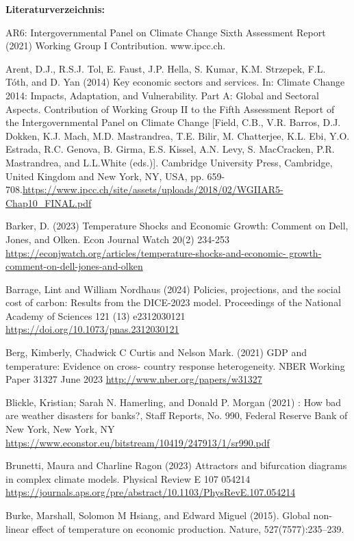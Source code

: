 \documentclass[12pt,paper=a4,DIV=12,parskip=never,chapterprefix=false,headings=standardclasses]{scrreprt}
\begin{document}
\vfill
\noindent\textbf{Literaturverzeichnis:}

\begingroup
\parindent=0pt
\everypar{\hangindent=2em\hangafter=1\relax}

AR6: Intergovernmental Panel on Climate Change Sixth Assessment Report (2021) Working Group I
Contribution. www.ipcc.ch.

Arent, D.J., R.S.J. Tol, E. Faust, J.P. Hella, S. Kumar, K.M. Strzepek, F.L. Tóth, and D. Yan (2014) Key
economic sectors and services. In: Climate Change 2014: Impacts, Adaptation, and Vulnerability. Part
A: Global and Sectoral Aspects. Contribution of Working Group II to the Fifth Assessment Report of
the Intergovernmental Panel on Climate Change [Field, C.B., V.R. Barros, D.J. Dokken, K.J. Mach,
M.D. Mastrandrea, T.E. Bilir, M. Chatterjee, K.L. Ebi, Y.O. Estrada, R.C. Genova, B. Girma, E.S.
Kissel, A.N. Levy, S. MacCracken, P.R. Mastrandrea, and L.L.White (eds.)]. Cambridge University
Press, Cambridge, United Kingdom and New York, NY, USA, pp. 659-
708.\url{https://www.ipcc.ch/site/assets/uploads/2018/02/WGIIAR5-Chap10_FINAL.pdf}

Barker, D. (2023) Temperature Shocks and Economic Growth: Comment on Dell, Jones, and Olken. Econ
Journal Watch 20(2) 234-253 \url{https://econjwatch.org/articles/temperature-shocks-and-economic-
growth-comment-on-dell-jones-and-olken}

Barrage, Lint and William Nordhaus (2024) Policies, projections, and the social cost of carbon: Results
from the DICE-2023 model. Proceedings of the National Academy of Sciences 121 (13) e2312030121
\url{https://doi.org/10.1073/pnas.2312030121}

Berg, Kimberly, Chadwick C Curtis and Nelson Mark. (2021) GDP and temperature: Evidence on cross-
country response heterogeneity. NBER Working Paper 31327 June 2023
\url{http://www.nber.org/papers/w31327}

Blickle, Kristian; Sarah N. Hamerling, and Donald P. Morgan (2021) : How bad are weather disasters for
banks?, Staff Reports, No. 990, Federal Reserve Bank of New York, New York, NY
\url{https://www.econstor.eu/bitstream/10419/247913/1/sr990.pdf}

Brunetti, Maura and Charline Ragon (2023) Attractors and bifurcation diagrams in complex climate models.
Physical Review E 107 054214 \url{https://journals.aps.org/pre/abstract/10.1103/PhysRevE.107.054214}

Burke, Marshall, Solomon M Hsiang, and Edward Miguel (2015). Global non-linear effect of temperature
on economic production. Nature, 527(7577):235–239.
\end{document}
